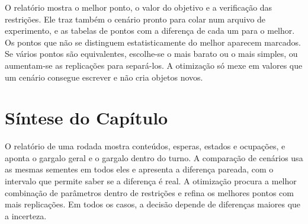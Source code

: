 O relatório mostra o melhor ponto, o valor do objetivo e a verificação das restrições. Ele traz também o cenário pronto para colar num arquivo de experimento, e as tabelas de pontos com a diferença de cada um para o melhor. Os pontos que não se distinguem estatisticamente do melhor aparecem marcados. Se vários pontos são equivalentes, escolhe-se o mais barato ou o mais simples, ou aumentam-se as replicações para separá-los. A otimização só mexe em valores que um cenário consegue escrever e não cria objetos novos.

\section{Síntese do Capítulo}

\begin{sintese}
O relatório de uma rodada mostra conteúdos, esperas, estados e ocupações, e aponta o gargalo geral e o gargalo dentro do turno. A comparação de cenários usa as mesmas sementes em todos eles e apresenta a diferença pareada, com o intervalo que permite saber se a diferença é real. A otimização procura a melhor combinação de parâmetros dentro de restrições e refina os melhores pontos com mais replicações. Em todos os casos, a decisão depende de diferenças maiores que a incerteza.
\end{sintese}
